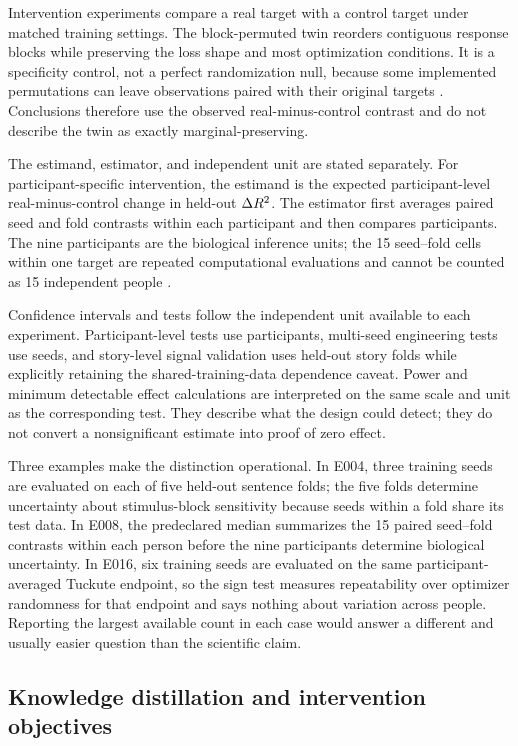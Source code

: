 Intervention experiments compare a real target with a control target under matched training settings.
The block-permuted twin reorders contiguous response blocks while preserving the loss shape and most optimization conditions.
It is a specificity control, not a perfect randomization null, because some implemented permutations can leave observations paired with their original targets .
Conclusions therefore use the observed real-minus-control contrast and do not describe the twin as exactly marginal-preserving.

The estimand, estimator, and independent unit are stated separately.
For participant-specific intervention, the estimand is the expected participant-level real-minus-control change in held-out $\Delta R^2$.
The estimator first averages paired seed and fold contrasts within each participant and then compares participants.
The nine participants are the biological inference units; the 15 seed--fold cells within one target are repeated computational evaluations and cannot be counted as 15 independent people .

Confidence intervals and tests follow the independent unit available to each experiment.
Participant-level tests use participants, multi-seed engineering tests use seeds, and story-level signal validation uses held-out story folds while explicitly retaining the shared-training-data dependence caveat.
Power and minimum detectable effect calculations are interpreted on the same scale and unit as the corresponding test.
They describe what the design could detect; they do not convert a nonsignificant estimate into proof of zero effect.

Three examples make the distinction operational.
In E004, three training seeds are evaluated on each of five held-out sentence folds; the five folds determine uncertainty about stimulus-block sensitivity because seeds within a fold share its test data.
In E008, the predeclared median summarizes the 15 paired seed--fold contrasts within each person before the nine participants determine biological uncertainty.
In E016, six training seeds are evaluated on the same participant-averaged Tuckute endpoint, so the sign test measures repeatability over optimizer randomness for that endpoint and says nothing about variation across people.
Reporting the largest available count in each case would answer a different and usually easier question than the scientific claim.

\subsection{Knowledge distillation and intervention objectives}

